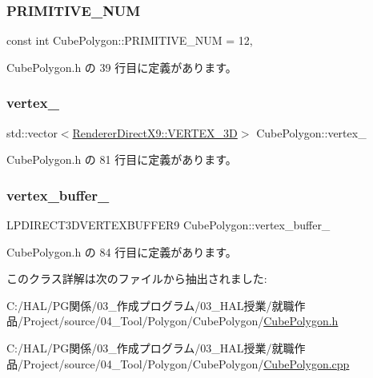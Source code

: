 \subsubsection{\texorpdfstring{P\+R\+I\+M\+I\+T\+I\+V\+E\+\_\+\+N\+UM}{PRIMITIVE\_NUM}}
{\footnotesize\ttfamily const int Cube\+Polygon\+::\+P\+R\+I\+M\+I\+T\+I\+V\+E\+\_\+\+N\+UM = 12\hspace{0.3cm}{\ttfamily [static]}, {\ttfamily [private]}}



 Cube\+Polygon.\+h の 39 行目に定義があります。

\mbox{\label{class_cube_polygon_adef890976f8ff8675aeb1c8a5a56ba7b}} 
\subsubsection{\texorpdfstring{vertex\+\_\+}{vertex\_}}
{\footnotesize\ttfamily std\+::vector$<$\mbox{\hyperlink{class_renderer_direct_x9_1_1_v_e_r_t_e_x__3_d}{Renderer\+Direct\+X9\+::\+V\+E\+R\+T\+E\+X\+\_\+3D}}$>$ Cube\+Polygon\+::vertex\+\_\+\hspace{0.3cm}{\ttfamily [private]}}



 Cube\+Polygon.\+h の 81 行目に定義があります。

\mbox{\label{class_cube_polygon_adbb5b6de2c10bfaba0d91569ac81e589}} 
\subsubsection{\texorpdfstring{vertex\+\_\+buffer\+\_\+}{vertex\_buffer\_}}
{\footnotesize\ttfamily L\+P\+D\+I\+R\+E\+C\+T3\+D\+V\+E\+R\+T\+E\+X\+B\+U\+F\+F\+E\+R9 Cube\+Polygon\+::vertex\+\_\+buffer\+\_\+\hspace{0.3cm}{\ttfamily [private]}}



 Cube\+Polygon.\+h の 84 行目に定義があります。



このクラス詳解は次のファイルから抽出されました\+:\begin{DoxyCompactItemize}
\item 
C\+:/\+H\+A\+L/\+P\+G関係/03\+\_\+作成プログラム/03\+\_\+\+H\+A\+L授業/就職作品/\+Project/source/04\+\_\+\+Tool/\+Polygon/\+Cube\+Polygon/\mbox{\hyperlink{_cube_polygon_8h}{Cube\+Polygon.\+h}}\item 
C\+:/\+H\+A\+L/\+P\+G関係/03\+\_\+作成プログラム/03\+\_\+\+H\+A\+L授業/就職作品/\+Project/source/04\+\_\+\+Tool/\+Polygon/\+Cube\+Polygon/\mbox{\hyperlink{_cube_polygon_8cpp}{Cube\+Polygon.\+cpp}}\end{DoxyCompactItemize}
